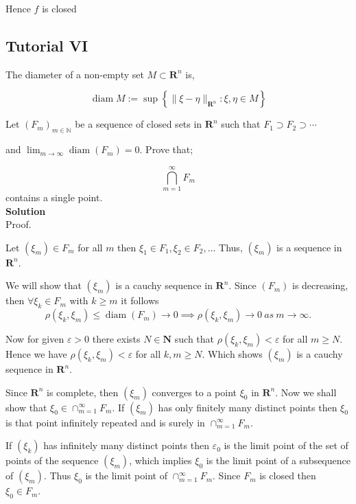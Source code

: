 \documentclass{article}
\begin{document}
Hence $f$ is  closed

\subsection{Tutorial VI}

The diameter of a non-empty set $M \subset \mathbf{R}^{n}$ is,

$$
\operatorname{diam} M:=\sup \left\{\|\xi-\eta\|_{\mathbf{R}^{n}}: \xi, \eta \in M\right\}
$$

Let $\left(F_{m}\right)_{m \in \mathbb{N}}$ be a sequence of closed sets in $\mathbf{R}^{n}$ such that $F_{1} \supset F_{2} \supset \cdots$ 

and $\lim _{m \rightarrow \infty} \operatorname{diam}\left(F_{m}\right)=0$. Prove that;

$$\bigcap_{m=1}^\infty F_m$$
contains a single point.\\


\textbf{Solution}\\

Proof. 

Let $\left(\xi_{m}\right) \in F_{m}$ for all $m$ then $\xi_{1} \in F_{1}, \xi_{2} \in F_{2}, \ldots$ Thus, $\left(\xi_{m}\right)$ is a sequence in $\mathbf{R}^{n}$.

We will show that $\left(\xi_{m}\right)$ is a cauchy sequence in $\mathbf{R}^{n}$. Since $\left(F_{m}\right)$ is decreasing, then $\forall \xi_{k} \in F_{m}$ with $k \geq m$ it follows
$$\rho\left(\xi_{k}, \xi_{m}\right) \leq \operatorname{diam}\left(F_{m}\right) \longrightarrow 0 \implies \rho\left(\xi_{k}, \xi_{m}\right) \longrightarrow 0~as~ m \longrightarrow \infty.$$

Now for given $\varepsilon>0$ there exists $N \in \mathbf{N}$ such that $\rho\left(\xi_{k}, \xi_{m}\right)<\varepsilon$ for all $m \geq N$. Hence we have $\rho\left(\xi_{k}, \xi_{m}\right)<\varepsilon$ for all $k, m \geq N$. Which shows $\left(\xi_{m}\right)$ is a cauchy sequence in $\mathbf{R}^{n}$.

Since $\mathbf{R}^{n}$ is complete, then $\left(\xi_{m}\right)$ converges to a point $\xi_{0}$ in $\mathbf{R}^{n}$. Now we shall show that $\xi_{0} \in \cap_{m=1}^{\infty} F_{m}$. If $\left(\xi_{m}\right)$ has only finitely many distinct points then $\xi_{0}$ is that point infinitely repeated and is surely in $\cap_{m=1}^{\infty} F_{m}$.

If $\left(\xi_{k}\right)$ has infinitely many distinct points then $\varepsilon_{0}$ is the limit point of the set of points of the sequence $\left(\xi_{m}\right)$, which implies $\xi_{0}$ is the limit point of a subsequence of $\left(\xi_{m}\right)$. Thus $\xi_{0}$ is the limit point of $\cap_{m=1}^{\infty} F_{m}$. Since $F_{m}$ is closed then $\xi_{0} \in F_{m}$.
\end{document}

